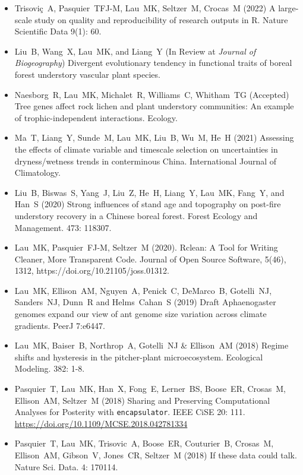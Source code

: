 \documentclass[a4paper]{article}
\begin{document}
\begin{itemize}
\item Trisoviç~A, Pasquier~TFJ-M, Lau~MK, Seltzer~M, Crocas~M (2022)
  A large-scale study on quality and reproducibility of research
  outputs in R. Nature Scientific Data 9(1): 60. 
\item Liu~B, Wang~X, Lau~MK, and Liang~Y (In Review at \textit{Journal
  of Biogeography}) Divergent evolutionary tendency in functional
  traits of boreal forest understory vascular plant species.
\item Naesborg~R, Lau~MK, Michalet~R, Williams~C, Whitham~TG
  (Accepted) Tree genes affect rock lichen and plant understory
  communities: An example of trophic-independent
  interactions. Ecology.
\item Ma~T, Liang~Y, Sunde~M, Lau~MK, Liu~B, Wu~M, He~H (2021)
  Assessing the effects of climate variable and timescale selection on
  uncertainties in dryness/wetness trends in conterminous
  China. International Journal of Climatology.
\item Liu~B, Biswas~S, Yang~J, Liu~Z, He~H, Liang~Y, Lau~MK, Fang~Y,
  and Han~S (2020) Strong influences of stand age and topography on
  post-fire understory recovery in a Chinese boreal forest. Forest
  Ecology and Management. 473: 118307.
\item Lau~MK, Pasquier~FJ-M, Seltzer~M (2020). Rclean: A Tool for
  Writing Cleaner, More Transparent Code. Journal of Open Source
  Software, 5(46), 1312, https://doi.org/10.21105/joss.01312.
\item  Lau~MK, Ellison~AM, Nguyen~A, Penick~C, DeMarco~B, Gotelli~NJ,
  Sanders~NJ, Dunn~R and Helms~Cahan~S (2019) Draft Aphaenogaster
  genomes expand our view of ant genome size variation across climate
  gradients. PeerJ 7:e6447. 
\item  Lau~MK, Baiser~B, Northrop~A, Gotelli~NJ \& Ellison~AM (2018) Regime
  shifts and hysteresis in the pitcher-plant
  microecosystem. Ecological Modeling. 382: 1-8.
\item 
  Pasquier~T, Lau~MK, Han~X, Fong~E, Lerner~BS, Boose~ER, Crosas~M,
  Ellison~AM, Seltzer~M (2018) Sharing and Preserving Computational
  Analyses for Posterity with \texttt{encapsulator}. IEEE CiSE 20:
  111. \href{https://doi.org/10.1109/MCSE.2018.042781334}{https://doi.org/10.1109/MCSE.2018.042781334}
\item 
  Pasquier~T, Lau~MK, Trisovic~A, Boose~ER, Couturier~B, Crosas~M,
  Ellison~AM, Gibson~V, Jones~CR, Seltzer~M (2018) If these data could
  talk. Nature Sci. Data. 4: 170114.

\end{itemize}
\end{document}
